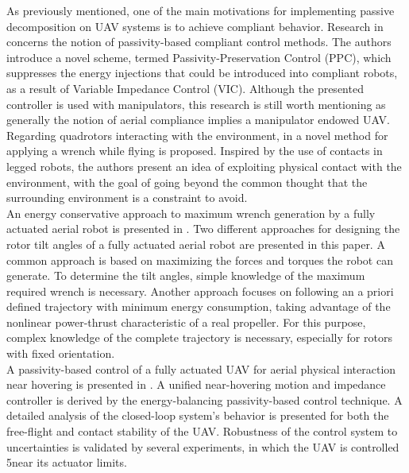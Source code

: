 As previously mentioned, one of the main motivations for implementing passive decomposition on UAV systems is to achieve compliant behavior. Research in \cite{passive-variable-impedance-compliant} concerns the notion of passivity-based compliant control methods. The authors introduce a novel scheme, termed Passivity-Preservation Control (PPC), which suppresses the energy injections that could be introduced into compliant robots, as a result of Variable Impedance Control (VIC). Although the presented controller is used with manipulators, this research is still worth mentioning as generally the notion of aerial compliance implies a manipulator endowed UAV. \\
Regarding quadrotors interacting with the environment, in \cite{quadrotor-itneraction-environment} a novel method for applying a wrench while flying is proposed. Inspired by the use of contacts in legged robots, the authors present an idea of exploiting physical contact with the environment, with the goal of going beyond the common thought that the surrounding environment is a constraint to avoid. \\
An energy conservative approach to maximum wrench generation by a fully actuated aerial robot is presented in \cite{max-wrench-min-energy}. Two different approaches for designing the rotor tilt angles of a fully actuated aerial robot are presented in this paper. A common approach is based on maximizing the forces and torques the robot can generate. To determine the tilt angles, simple knowledge of the maximum required wrench is necessary. Another approach focuses on following an a priori defined trajectory with minimum energy consumption, taking advantage of the nonlinear power-thrust characteristic of a real propeller. For this purpose, complex knowledge of the complete trajectory is necessary, especially for rotors with fixed orientation.   \\
A passivity-based control of a fully actuated UAV for aerial physical interaction near hovering is presented in \cite{passivity-based-physical-interaction}. A unified near-hovering motion and impedance controller is derived by the energy-balancing passivity-based control technique. A detailed analysis of the closed-loop system’s behavior  is presented for both the free-flight and contact stability of the UAV. Robustness of the control system to uncertainties is validated by several experiments, in which the UAV is controlled 5near its actuator limits.

\cite{passivity-based-aerial-interaction} 

